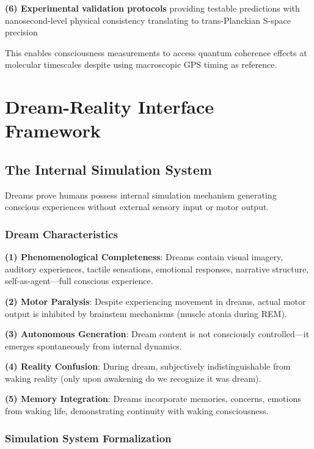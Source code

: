 \documentclass[11pt,onecolumn]{article}
\begin{document}
\textbf{(6) Experimental validation protocols} providing testable predictions with nanosecond-level physical consistency translating to trans-Planckian S-space precision

This enables consciousness measurements to access quantum coherence effects at molecular timescales despite using macroscopic GPS timing as reference.

\clearpage

\section{Dream-Reality Interface Framework}

\subsection{The Internal Simulation System}

Dreams prove humans possess internal simulation mechanism generating conscious experiences without external sensory input or motor output.

\subsubsection{Dream Characteristics}

\textbf{(1) Phenomenological Completeness}: Dreams contain visual imagery, auditory experiences, tactile sensations, emotional responses, narrative structure, self-as-agent---full conscious experience.

\textbf{(2) Motor Paralysis}: Despite experiencing movement in dreams, actual motor output is inhibited by brainstem mechanisms (muscle atonia during REM).

\textbf{(3) Autonomous Generation}: Dream content is not consciously controlled---it emerges spontaneously from internal dynamics.

\textbf{(4) Reality Confusion}: During dream, subjectively indistinguishable from waking reality (only upon awakening do we recognize it was dream).

\textbf{(5) Memory Integration}: Dreams incorporate memories, concerns, emotions from waking life, demonstrating continuity with waking consciousness.

\subsubsection{Simulation System Formalization}
\end{document}
